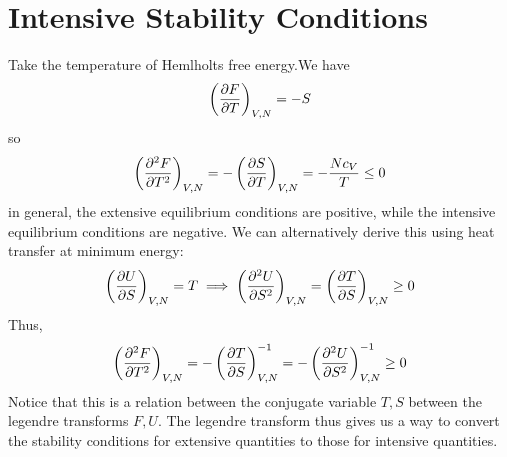 \section{Intensive Stability Conditions}
Take the temperature of Hemlholts free energy.We have
\[\left(\frac{\partial F}{\partial T}\right)_{V,N}=-S\]
so
\[\left(\frac{\partial ^2F}{\partial T^2}\right)_{V,N}=-\left(\frac{\partial S}{\partial T}\right)_{V,N}=-\frac{Nc_V}{T}\leq0\]
in general, the extensive equilibrium conditions are positive, while the intensive equilibrium conditions are negative. We can alternatively derive this using heat transfer at minimum energy:
\[\left(\frac{\partial U}{\partial S}\right)_{V,N}=T\implies\left(\frac{\partial ^2U}{\partial S^2}\right)_{V,N}=\left(\frac{\partial T}{\partial S}\right)_{V,N}\geq0\]
Thus,
\[\left(\frac{\partial ^2F}{\partial T^2}\right)_{V,N}=-\left(\frac{\partial T}{\partial S}\right)_{V,N}^{-1}=-\left(\frac{\partial ^2U}{\partial S^2}\right)^{-1}_{V,N}\geq0\]
Notice that this is a relation between the conjugate variable \(T,S\) between the legendre transforms \(F,U\). The legendre transform thus gives us a way to convert the stability conditions for extensive quantities to those for intensive quantities.


